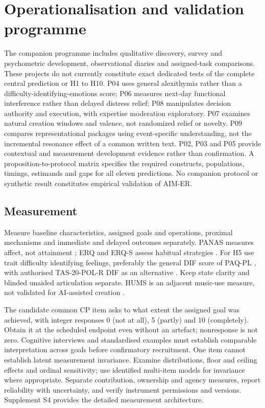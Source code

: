 \documentclass[11pt,a4paper]{article}
\begin{document}
\section{Operationalisation and validation programme}
The companion programme includes qualitative discovery, survey and psychometric development, observational diaries and assigned-task comparisons. These projects do not currently constitute exact dedicated tests of the complete central prediction or H1 to H10. P04 uses general alexithymia rather than a difficulty-identifying-emotions score; P06 measures next-day functional interference rather than delayed distress relief; P08 manipulates decision authority and execution, with expertise moderation exploratory. P07 examines natural creation windows and valence, not randomized relief or novelty. P09 compares representational packages using event-specific understanding, not the incremental resonance effect of a common written text. P02, P03 and P05 provide contextual and measurement development evidence rather than confirmation. A proposition-to-protocol matrix specifies the required constructs, populations, timings, estimands and gaps for all eleven predictions. No companion protocol or synthetic result constitutes empirical validation of AIM-ER.
\subsection{Measurement}
Measure baseline characteristics, assigned goals and operations, proximal mechanisms and immediate and delayed outcomes separately. PANAS measures affect, not attainment \citep{watson1988}; ERQ and ERQ-S assess habitual strategies \citep{grossjohn2003,erqspl2024}. For H5 use trait difficulty identifying feelings, preferably the general DIF score of PAQ-PL \citep{paqpl2022}, with authorised TAS-20-POL-R DIF as an alternative \citep{bagby1994,taspl2026}. Keep state clarity and blinded unaided articulation separate. HUMS is an adjacent music-use measure, not validated for AI-assisted creation \citep{hums2015}.

The candidate common CP item asks to what extent the assigned goal was achieved, with integer responses 0 (not at all), 5 (partly) and 10 (completely). Obtain it at the scheduled endpoint even without an artefact; nonresponse is not zero. Cognitive interviews and standardised examples must establish comparable interpretation across goals before confirmatory recruitment. One item cannot establish latent measurement invariance. Examine distributions, floor and ceiling effects and ordinal sensitivity; use identified multi-item models for invariance where appropriate. Separate contribution, ownership and agency measures, report reliability with uncertainty, and verify instrument permissions and versions. Supplement S4 provides the detailed measurement architecture.
\end{document}
